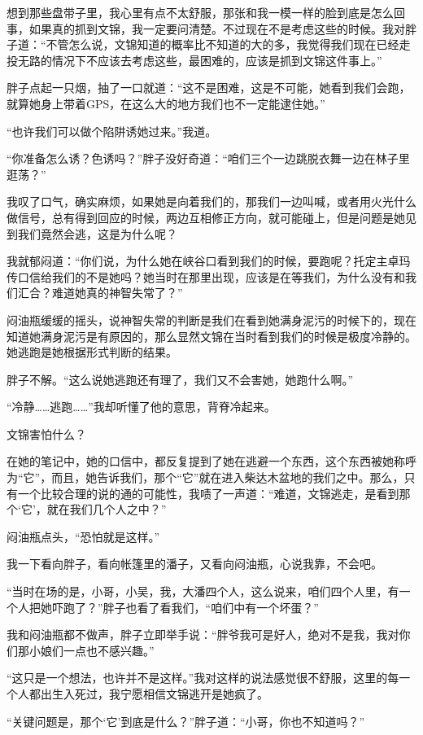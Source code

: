 想到那些盘带子里，我心里有点不太舒服，那张和我一模一样的脸到底是怎么回事，如果真的抓到文锦，我一定要问清楚。不过现在不是考虑这些的时候。我对胖子道：“不管怎么说，文锦知道的概率比不知道的大的多，我觉得我们现在已经走投无路的情况下不应该去考虑这些，最困难的，应该是抓到文锦这件事上。”

胖子点起一只烟，抽了一口就道：“这不是困难，这是不可能，她看到我们会跑，就算她身上带着GPS，在这么大的地方我们也不一定能逮住她。”

“也许我们可以做个陷阱诱她过来。”我道。

“你准备怎么诱？色诱吗？”胖子没好奇道：“咱们三个一边跳脱衣舞一边在林子里逛荡？”

我叹了口气，确实麻烦，如果她是向着我们的，那我们一边叫喊，或者用火光什么做信号，总有得到回应的时候，两边互相修正方向，就可能碰上，但是问题是她见到我们竟然会逃，这是为什么呢？

我就郁闷道：“你们说，为什么她在峡谷口看到我们的时候，要跑呢？托定主卓玛传口信给我们的不是她吗？她当时在那里出现，应该是在等我们，为什么没有和我们汇合？难道她真的神智失常了？”

闷油瓶缓缓的摇头，说神智失常的判断是我们在看到她满身泥污的时候下的，现在知道她满身泥污是有原因的，那么显然文锦在当时看到我们的时候是极度冷静的。她逃跑是她根据形式判断的结果。

胖子不解。“这么说她逃跑还有理了，我们又不会害她，她跑什么啊。”

“冷静……逃跑……”我却听懂了他的意思，背脊冷起来。

文锦害怕什么？

在她的笔记中，她的口信中，都反复提到了她在逃避一个东西，这个东西被她称呼为“它”，而且，她告诉我们，那个“它”就在进入柴达木盆地的我们之中。那么，只有一个比较合理的说的通的可能性，我啧了一声道：“难道，文锦逃走，是看到那个‘它’，就在我们几个人之中？”

闷油瓶点头，“恐怕就是这样。”

我一下看向胖子，看向帐篷里的潘子，又看向闷油瓶，心说我靠，不会吧。

“当时在场的是，小哥，小吴，我，大潘四个人，这么说来，咱们四个人里，有一个人把她吓跑了？”胖子也看了看我们，“咱们中有一个坏蛋？”

我和闷油瓶都不做声，胖子立即举手说：“胖爷我可是好人，绝对不是我，我对你们那小娘们一点也不感兴趣。”

“这只是一个想法，也许并不是这样。”我对这样的说法感觉很不舒服，这里的每一个人都出生入死过，我宁愿相信文锦逃开是她疯了。

“关键问题是，那个‘它’到底是什么？”胖子道：“小哥，你也不知道吗？”

